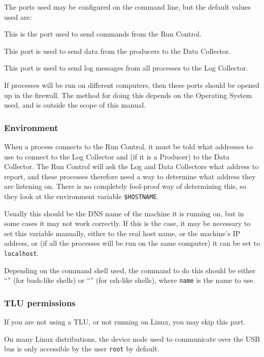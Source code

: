 The ports used may be configured on the command line, but the default values used are:
\begin{description}

This is the port used to send commands from the Run Control.

This port is used to send data from the producers to the Data Collector.

This port is used to send log messages from all processes to the Log Collector.

\end{description}

If processes will be run on different computers,
then these ports should be opened up in the firewall.
The method for doing this depends on the Operating System used,
and is outside the scope of this manual.

\subsubsection{Environment}
When a process connects to the Run Control, it must be told what addresses to use
to connect to the Log Collector and (if it is a Producer) to the Data Collector.
The Run Control will ask the Log and Data Collectors what address to report,
and these processes therefore need a way to determine what address they are listening on.
There is no completely fool-proof way of determining this,
so they look at the environment variable \texttt{\$HOSTNAME}.

Usually this should be the DNS name of the machine it is running on, but in some cases it may not work correctly.
If this is the case, it may be necessary to set this variable manually, either to the real host name,
or the machine's IP address, or (if all the processes will be run on the same computer) it can be set to \texttt{localhost}.

Depending on the command shell used, the command to do this should be either
``'' (for bash-like shells)
or ``'' (for csh-like shells),
where \texttt{name} is the name to use.

\subsubsection{TLU permissions}\label{sec:TLUperm}
If you are not using a TLU, or not running on Linux, you may skip this part.

On many Linux distributions, the device node used to communicate over the USB bus is only
accessible by the user \texttt{root} by default.

